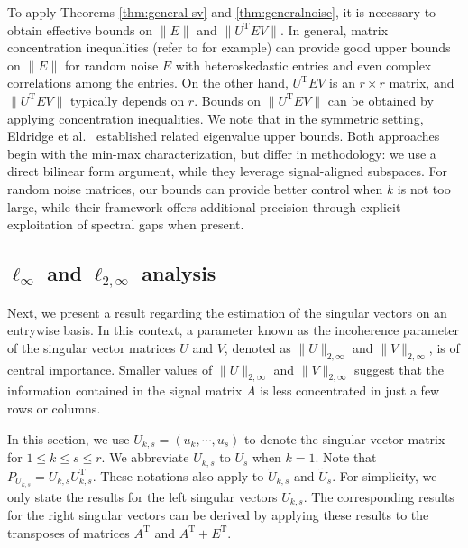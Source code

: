 \documentclass[reqno]{amsart}
\newcommand{\T}{\mathrm{T}}
\theoremstyle{plain}
\theoremstyle{definition}
\begin{document}
To apply Theorems \ref{thm:general-sv} and \ref{thm:generalnoise}, it is necessary to obtain effective bounds on $\|E\|$ and $\|U^\T E V \|$. In general, matrix concentration inequalities (refer to \cite{Tropp} for example) can provide good upper bounds on $\|E\|$ for random noise $E$ with heteroskedastic entries and even complex correlations among the entries. On the other hand, $U^\T E V$ is an $r\times r$ matrix, and $\|U^\T E V\|$ typically depends on $r$. Bounds on $\|U^\T E V\|$ can be obtained by applying concentration inequalities. We note that in the symmetric setting, Eldridge et al.~\cite[Theorem 6]{EBW18} established related eigenvalue upper bounds. Both approaches begin with the min-max characterization, but differ in methodology: we use a direct bilinear form argument, while they leverage signal-aligned subspaces. For random noise matrices, our bounds can provide better control when $k$ is not too large, while their framework offers additional precision through explicit exploitation of spectral gaps when present.


\subsection{$\ell_\infty$ and $\ell_{2, \infty}$ analysis}\label{sec:entrywise}
Next, we present a result regarding the estimation of the singular vectors on an entrywise basis. In this context, a parameter known as the incoherence parameter of the singular vector matrices $U$ and $V$, denoted as $\| U\|_{2,\infty}$ and $\| V\|_{2,\infty}$, is of central importance. Smaller values of  $\| U \|_{2,\infty}$ and $\| V \|_{2,\infty}$ suggest that the information contained in the signal matrix $A$ is less concentrated in just a few rows or columns. 

In this section, we use $U_{k,s}=(u_k,\cdots,u_s)$ to denote the singular vector matrix for $1\le k \le s \le r$. We abbreviate $U_{k,s}$ to $U_s$ when $k=1$. Note that $P_{U_{k,s}} = U_{k,s} U_{k,s}^\T$. These notations also apply to $\widetilde U_{k,s}$ and $\widetilde U_{s}$. For simplicity, we only state the results for the left singular vectors $U_{k,s}$. The corresponding results for the right singular vectors can be derived by applying these results to the transposes of matrices $A^\T$ and $A^\T+E^\T$.
\end{document}
